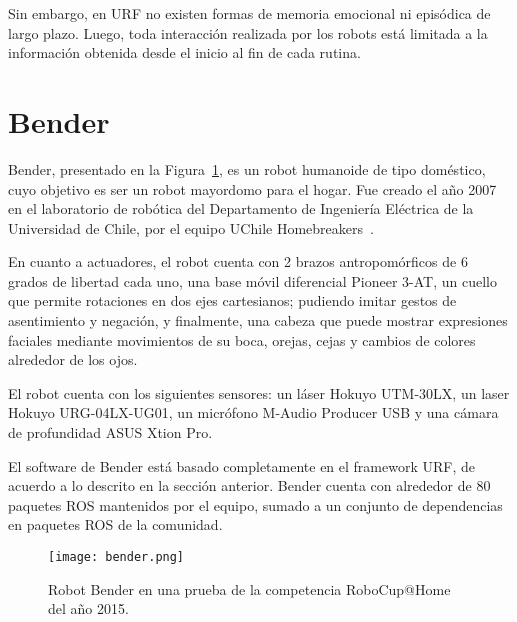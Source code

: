 Sin embargo, en URF no existen formas de memoria emocional ni episódica de largo plazo. Luego, toda interacción realizada por los robots está limitada a la información obtenida desde el inicio al fin de cada rutina.


\section{Bender}

Bender, presentado en la Figura~\ref{img:bender}, es un robot humanoide de tipo doméstico, cuyo objetivo es ser un robot mayordomo para el hogar. Fue creado el año 2007 en el laboratorio de robótica del Departamento de Ingeniería Eléctrica de la Universidad de Chile, por el equipo UChile Homebreakers~\cite{uchile-robotics}.

En cuanto a actuadores, el robot cuenta con 2 brazos antropomórficos de 6 grados de libertad cada uno, una base móvil diferencial Pioneer 3-AT, un cuello que permite rotaciones en dos ejes cartesianos; pudiendo imitar gestos de asentimiento y negación, y finalmente, una cabeza que puede mostrar expresiones faciales mediante movimientos de su boca, orejas, cejas y cambios de colores alrededor de los ojos.

El robot cuenta con los siguientes sensores: un láser Hokuyo UTM-30LX, un laser Hokuyo URG-04LX-UG01, un micrófono M-Audio Producer USB y una cámara de profundidad ASUS Xtion Pro.

El software de Bender está basado completamente en el framework URF, de acuerdo a lo descrito en la sección anterior. Bender cuenta con alrededor de 80 paquetes ROS mantenidos por el equipo, sumado a un conjunto de dependencias en paquetes ROS de la comunidad.

\begin{figure}[!ht]
	\centering
	\texttt{[image: bender.png]}
	\caption[Robot Bender en competencia RoboCup@Home, 2015.]
	{\small Robot Bender en una prueba de la competencia RoboCup@Home del año 2015.}
	\label{img:bender}
\end{figure}





